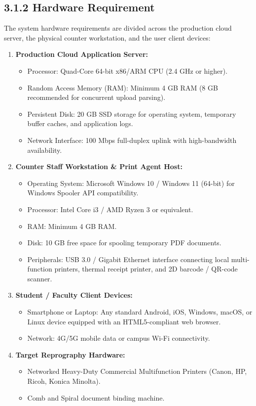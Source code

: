 \documentclass[12pt,a4paper,oneside]{report}
\begin{document}
\subsection{3.1.2 Hardware Requirement}
The system hardware requirements are divided across the production cloud server, the physical counter workstation, and the user client devices:
\begin{enumerate}[leftmargin=0.35in, itemsep=2pt]
  \item \textbf{Production Cloud Application Server:}
    \begin{itemize}[itemsep=1pt]
      \item Processor: Quad-Core 64-bit x86/ARM CPU (2.4 GHz or higher).
      \item Random Access Memory (RAM): Minimum 4 GB RAM (8 GB recommended for concurrent upload parsing).
      \item Persistent Disk: 20 GB SSD storage for operating system, temporary buffer caches, and application logs.
      \item Network Interface: 100 Mbps full-duplex uplink with high-bandwidth availability.
    \end{itemize}
  \item \textbf{Counter Staff Workstation \& Print Agent Host:}
    \begin{itemize}[itemsep=1pt]
      \item Operating System: Microsoft Windows 10 / Windows 11 (64-bit) for Windows Spooler API compatibility.
      \item Processor: Intel Core i3 / AMD Ryzen 3 or equivalent.
      \item RAM: Minimum 4 GB RAM.
      \item Disk: 10 GB free space for spooling temporary PDF documents.
      \item Peripherals: USB 3.0 / Gigabit Ethernet interface connecting local multi-function printers, thermal receipt printer, and 2D barcode / QR-code scanner.
    \end{itemize}
  \item \textbf{Student / Faculty Client Devices:}
    \begin{itemize}[itemsep=1pt]
      \item Smartphone or Laptop: Any standard Android, iOS, Windows, macOS, or Linux device equipped with an HTML5-compliant web browser.
      \item Network: 4G/5G mobile data or campus Wi-Fi connectivity.
    \end{itemize}
  \item \textbf{Target Reprography Hardware:}
    \begin{itemize}[itemsep=1pt]
      \item Networked Heavy-Duty Commercial Multifunction Printers (Canon, HP, Ricoh, Konica Minolta).
      \item Comb and Spiral document binding machine.
    \end{itemize}
\end{enumerate}
\end{document}

